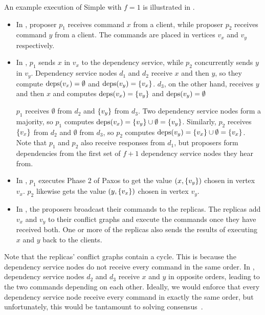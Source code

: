 An example execution of Simple \BPaxos{} with $f=1$ is illustrated in
.
\begin{itemize}
  \item
    In , proposer $p_1$ receives command $x$ from
    a client, while proposer $p_2$ receives command $y$ from a client. The
    commands are placed in vertices $v_x$ and $v_y$ respectively.

  \item
    In , $p_1$ sends $x$ in $v_x$ to the dependency
    service, while $p_2$ concurrently sends $y$ in $v_y$. Dependency service
    nodes $d_1$ and $d_2$ receive $x$ and then $y$, so they compute $\text{deps}(v_x)
    = \emptyset$ and $\text{deps}(v_y) = \{v_x\}$. $d_3$, on the other hand,
    receives $y$ and then $x$ and computes $\text{deps}(v_x) = \{v_y\}$ and
    $\text{deps}(v_y) = \emptyset$

    $p_1$ receives $\emptyset$ from $d_2$ and $\{v_y\}$ from $d_3$. Two
    dependency service nodes form a majority, so $p_1$ computes $\text{deps}(v_x) =
    \{v_y\} \cup \emptyset = \{v_y\}$. Similarly, $p_2$ receives
    $\{v_x\}$ from $d_2$ and $\emptyset$ from $d_3$, so $p_2$ computes
    $\text{deps}(v_y) = \{v_x\} \cup \emptyset = \{v_x\}$. Note that $p_1$ and
    $p_2$ also receive responses from $d_1$, but proposers form dependencies
    from the first set of $f+1$ dependency service nodes they hear from.

  \item
    In , $p_1$ executes Phase 2 of Paxos to get
    the value $(x, \{v_y\})$ chosen in vertex $v_x$. $p_2$ likewise gets the
    value $(y, \{v_x\})$ chosen in vertex $v_y$.

  \item
    In , the proposers broadcast their commands to
    the replicas. The replicas add $v_x$ and $v_y$ to their conflict graphs and
    execute the commands once they have received both. One or more of the
    replicas also sends the results of executing $x$ and $y$ back to the
    clients.
\end{itemize}

Note that the replicas' conflict graphs contain a cycle. This is because the
dependency service nodes do not receive every command in the same order. In
, dependency service nodes $d_2$ and $d_3$ receive
$x$ and $y$ in opposite orders, leading to the two commands depending on each
other. Ideally, we would enforce that every dependency service node receive
every command in exactly the same order, but unfortunately, this would be
tantamount to solving consensus~\cite{chandra2007paxos}.

